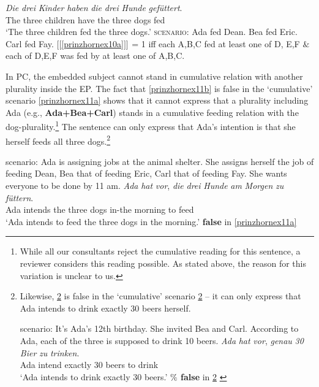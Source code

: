 \documentclass[output=paper,colorlinks,citecolor=brown,
]{langscibook}
\newcommand{\sem}[2]{\mbox{$[\![${#2}$]\!]^{#1}$}} %
\begin{document}
\ea \label{prinzhornmyex}
\ea \gll \textit{Die} \textit{drei}  \textit{Kinder} \textit{haben} \textit{die} \textit{drei} \textit{Hunde} \textit{gef\"{u}ttert}.\\
    The three children have the three dogs fed \\
\glt `The three children fed the three dogs.' \label{prinzhornex10a}
\ex   \textsc{scenario}: Ada fed Dean. Bea fed Eric. Carl fed Fay.  \label{prinzhornex10b}
\ex \sem{}{\ref{prinzhornex10a}} = 1 iff each A,B,C fed at least one of  D, E,F $\&$ each of D,E,F was fed by at least one of A,B,C.\label{prinzhornex10c}
\z \z

In PC, the embedded subject cannot stand in cumulative relation with another plurality inside the EP. The fact that \ref{prinzhornex11b} is false in the `cumulative' scenario \ref{prinzhornex11a} shows that it cannot express that a plurality including Ada (e.g., \textbf{Ada+Bea+Carl}) stands in a cumulative feeding relation with the dog-plurality.\footnote{While all our consultants reject the cumulative reading for this sentence, a reviewer considers this reading possible. As stated above, the reason for this variation is unclear to us.} The sentence can only express that Ada's intention is that she herself feeds all three dogs.\footnote{Likewise, \ref{prinzhornex12b} is false in the `cumulative' scenario \ref{prinzhornex12a} -- it can only express that Ada intends to drink exactly 30 beers herself. 

\ea 
\ea \label{prinzhornex12a} {\sc scenario: } It's Ada's 12th birthday. She invited Bea and Carl. According to Ada, each of the three is supposed to drink 10 beers.
\ex \gll \textit{Ada} \textit{hat} \textit{vor}, \textit{genau} \textit{30} \textit{Bier} \textit{zu} \textit{trinken}.\\
   Ada intend {} exactly 30 beers to drink \\
   \glt `Ada intends to drink exactly 30 beers.' \hfill \textbf{$\%$ false} in \ref{prinzhornex12a}  \label{prinzhornex12b}
\z \z

}

\ea \label{prinzhornex11}
\ea \label{prinzhornex11a} {\sc scenario: } Ada is assigning jobs at the animal shelter. She assigns herself the job of feeding Dean,  Bea that of feeding  Eric,  Carl that of feeding  Fay. She wants everyone to be done by 11 am. 
\ex \gll \textit{Ada} \textit{hat} \textit{vor}, \textit{die} \textit{drei} \textit{Hunde} \textit{am} \textit{Morgen} \textit{zu} \textit{f\"{u}ttern}.\\
   Ada intends {} the three dogs in-the morning to feed \\
   \glt `Ada intends to feed the three dogs in the morning.' \hfill \textbf{false} in \ref{prinzhornex11a} \label{prinzhornex11b}
\z \z
\end{document}
